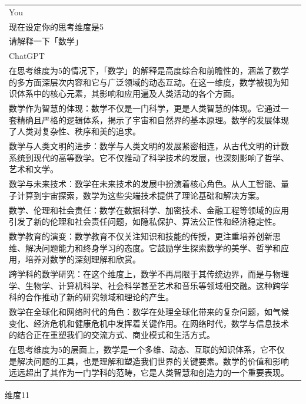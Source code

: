 \documentclass[12pt]{book}
\begin{document}
\begin{tabular}{|p{15cm}|p{3cm}|}
	\hline
You\\
现在设定你的思考维度是5\\
请解释一下「数学」\\
ChatGPT\\
在思考维度为5的情况下，「数学」的解释是高度综合和前瞻性的，涵盖了数学的多方面深层次内容和它与广泛领域的动态互动。在这一维度，数学被视为知识体系中的核心元素，其影响和应用遍及人类活动的各个方面。\\
数学作为智慧的体现：数学不仅是一门科学，更是人类智慧的体现。它通过一套精确且严格的逻辑体系，揭示了宇宙和自然界的基本原理。数学的发展体现了人类对复杂性、秩序和美的追求。\\
数学与人类文明的进步：数学与人类文明的发展紧密相连，从古代文明的计数系统到现代的高等数学。它不仅推动了科学技术的发展，也深刻影响了哲学、艺术和文学。\\
数学与未来技术：数学在未来技术的发展中扮演着核心角色。从人工智能、量子计算到宇宙探索，数学为这些尖端技术提供了理论基础和解决方案。\\
数学、伦理和社会责任：数学在数据科学、加密技术、金融工程等领域的应用引发了新的伦理和社会责任问题，如隐私保护、算法公正性和经济稳定性。\\
数学教育的演变：数学教育不仅关注知识和技能的传授，更注重培养创新思维、解决问题能力和终身学习的态度。它鼓励学生探索数学的美学、哲学和应用，培养对数学的深刻理解和欣赏。\\
跨学科的数学研究：在这个维度上，数学不再局限于其传统边界，而是与物理学、生物学、计算机科学、社会科学甚至艺术和音乐等领域相交融。这种跨学科的合作推动了新的研究领域和理论的产生。\\
数学在全球化和网络时代的角色：数学在处理全球化带来的复杂问题，如气候变化、经济危机和健康危机中发挥着关键作用。在网络时代，数学与信息技术的结合正在重塑我们的交流方式、商业模式和生活方式。\\
在思考维度为5的层面上，数学是一个多维、动态、互联的知识体系，它不仅是解决问题的工具，也是理解和塑造我们世界的关键要素。数学的价值和影响远远超出了其作为一门学科的范畴，它是人类智慧和创造力的一个重要表现。\\
	\hline
\end{tabular}


\bigskip
维度11
\end{document}

